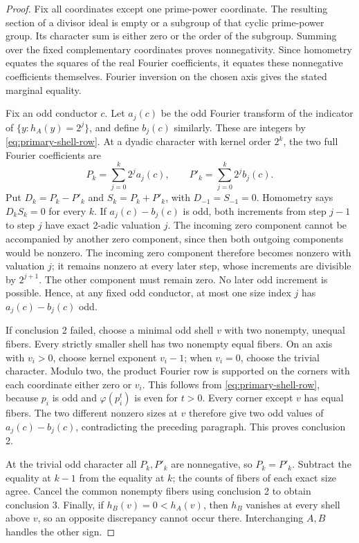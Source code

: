 \begin{proof}
Fix all coordinates except one prime-power coordinate. The resulting
section of a divisor ideal is empty or a subgroup of that cyclic
prime-power group. Its character sum is either zero or the order of the
subgroup. Summing over the fixed complementary coordinates proves
nonnegativity. Since homometry equates the squares of the real Fourier
coefficients, it equates these nonnegative coefficients themselves.
Fourier inversion on the chosen axis gives the stated marginal equality.

Fix an odd conductor \(c\). Let \(a_j(c)\) be the odd Fourier transform
of the indicator of \(\{y:h_A(y)=2^j\}\), and define \(b_j(c)\)
similarly. These are integers by \eqref{eq:primary-shell-row}. At a
dyadic character with kernel order \(2^k\), the two full Fourier
coefficients are
\[
P_k=\sum_{j=0}^k2^ja_j(c),\qquad
P'_k=\sum_{j=0}^k2^jb_j(c).
\]
Put \(D_k=P_k-P'_k\) and \(S_k=P_k+P'_k\), with
\(D_{-1}=S_{-1}=0\). Homometry says \(D_kS_k=0\) for every \(k\).
If \(a_j(c)-b_j(c)\) is odd, both increments from step \(j-1\) to
step \(j\) have exact 2-adic valuation \(j\). The incoming zero
component cannot be accompanied by another zero component, since then
both outgoing components would be nonzero. The incoming zero component
therefore becomes nonzero with valuation \(j\); it remains nonzero at
every later step, whose increments are divisible by \(2^{j+1}\).
The other component must remain zero. No later odd increment is
possible. Hence, at any fixed odd conductor, at most one size index
\(j\) has \(a_j(c)-b_j(c)\) odd.

If conclusion 2 failed, choose a minimal odd shell \(v\) with two
nonempty, unequal fibers. Every strictly smaller shell has two
nonempty equal fibers. On an axis with \(v_i>0\), choose kernel
exponent \(v_i-1\); when \(v_i=0\), choose the trivial character.
Modulo two, the product Fourier row is supported on the corners with
each coordinate either zero or \(v_i\). This follows from
\eqref{eq:primary-shell-row}, because \(p_i\) is odd and
\(\varphi(p_i^t)\) is even for \(t>0\). Every corner except \(v\)
has equal fibers. The two different nonzero sizes at \(v\) therefore
give two odd values of \(a_j(c)-b_j(c)\), contradicting the preceding
paragraph. This proves conclusion 2.

At the trivial odd character all \(P_k,P'_k\) are nonnegative, so
\(P_k=P'_k\). Subtract the equality at \(k-1\) from the equality
at \(k\); the counts of fibers of each exact size agree. Cancel the
common nonempty fibers using conclusion 2 to obtain conclusion 3.
Finally, if \(h_B(v)=0<h_A(v)\), then \(h_B\) vanishes at every
shell above \(v\), so an opposite discrepancy cannot occur there.
Interchanging \(A,B\) handles the other sign.
\end{proof}

